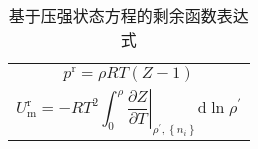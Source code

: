\documentclass[main.tex]{subfiles}
\begin{document}
\setlength{}
\begin{longtable}{m{}}
    \caption{基于压强状态方程的剩余函数表达式}\label{table:residual_functions_Mr}                                                                                                                                                                             \\
    \hline
    \begin{equation}
        p^\text{r}  =\rho RT\left(Z-1\right)
    \end{equation}                                                                                                                                                                                                       \\[-5ex]
    \begin{equation}
        U^\text{r}_\text{m}  =-RT^2\int_0^\rho\left.\frac{\partial Z}{\partial T}\right|_{\rho^\prime,\left\{n_i\right\}}\mathrm{d}\ln\rho^\prime
    \end{equation}                                                                                                  \\[- 5 ex]


\end{longtable}
\end{document}
